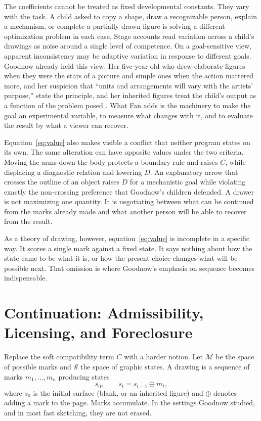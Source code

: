 \documentclass[11pt]{article}
\theoremstyle{remark}
\newcommand{\M}{\mathcal{M}}
\newcommand{\Sset}{\mathcal{S}}
\begin{document}
The coefficients cannot be treated as fixed developmental constants. They vary with the task. A child asked to copy a shape, draw a recognizable person, explain a mechanism, or complete a partially drawn figure is solving a different optimization problem in each case. Stage accounts read variation across a child's drawings as noise around a single level of competence. On a goal-sensitive view, apparent inconsistency may be adaptive variation in response to different goals. Goodnow already held this view. Her five-year-old who drew elaborate figures when they were the stars of a picture and simple ones when the action mattered more, and her suspicion that ``units and arrangements will vary with the artists' purpose,'' state the principle, and her inherited figures treat the child's output as a function of the problem posed \cite[pp.~46--47]{goodnow1977}. What Fan adds is the machinery to make the goal an experimental variable, to measure what changes with it, and to evaluate the result by what a viewer can recover.

Equation~\eqref{eq:value} also makes visible a conflict that neither program states on its own. The same alteration can have opposite values under the two criteria. Moving the arms down the body protects a boundary rule and raises $C$, while displacing a diagnostic relation and lowering $D$. An explanatory arrow that crosses the outline of an object raises $D$ for a mechanistic goal while violating exactly the non-crossing preference that Goodnow's children defended. A drawer is not maximizing one quantity. It is negotiating between what can be continued from the marks already made and what another person will be able to recover from the result.

As a theory of drawing, however, equation~\eqref{eq:value} is incomplete in a specific way. It scores a single mark against a fixed state. It says nothing about how the state came to be what it is, or how the present choice changes what will be possible next. That omission is where Goodnow's emphasis on sequence becomes indispensable.

\section{Continuation: Admissibility, Licensing, and Foreclosure}
\label{sec:continuation}

Replace the soft compatibility term $C$ with a harder notion. Let $\M$ be the space of possible marks and $\Sset$ the space of graphic states. A drawing is a sequence of marks $m_1, \dots, m_n$ producing states
\[
s_0, \qquad s_t = s_{t-1} \oplus m_t,
\]
where $s_0$ is the initial surface (blank, or an inherited figure) and $\oplus$ denotes adding a mark to the page. Marks accumulate. In the settings Goodnow studied, and in most fast sketching, they are not erased.
\end{document}

